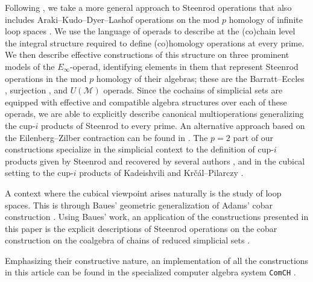 Following \cite{may70generalapproach}, we take a more general approach to Steenrod operations that also includes Araki--Kudo--Dyer--Lashof operations on the mod $p$ homology of infinite loop spaces \cites{araki56squaring, dyer62lashof}.
We use the language of operads \cite{may72geometry} to describe at the (co)chain level the integral structure required to define (co)homology operations at every prime.
We then describe effective constructions of this structure on three prominent models of the $E_\infty$-operad, identifying elements in them that represent Steenrod operations in the mod $p$ homology of their algebras; these are the Barratt--Eccles \cite{berger04combinatorial}, surjection \cite{mcclure03cochain}, and $U(\mathcal M)$ \cite{medina2020prop1} operads.
Since the cochains of simplicial sets are equipped with effective and compatible algebra structures over each of these operads, we are able to explicitly describe canonical multioperations generalizing the \mbox{cup-$i$} products of Steenrod to every prime.
An alternative approach based on the Eilenberg--Zilber contraction can be found in \cite{gonzalez2005hpt}.
The $p = 2$ part of our constructions specialize in the simplicial context to the definition of cup-$i$ products given by Steenrod \cite{steenrod47products} and recovered by several authors \cites{mcclure03cochain, berger04combinatorial, medina2021newformulas}, and in the cubical setting to the cup-$i$ products of Kadeishvili \cite{kadeishvili1998dg} and Kr\v{c}\'{a}l--Pilarczy \cite{pilarczyk2016cubical}.

A context where the cubical viewpoint arises naturally is the study of loop spaces.
This is through Baues' geometric generalization of Adams' cobar construction \cite{baues1980geometry, adams1957cobar}.
Using Baues' work, an application of the constructions presented in this paper is the explicit descriptions of Steenrod operations on the cobar construction on the coalgebra of chains of reduced simplicial sets \cite{medina2021cobar}.

Emphasizing their constructive nature, an implementation of all the constructions in this article can be found in the specialized computer algebra system \texttt{ComCH} \cite{medina2021computer}.

